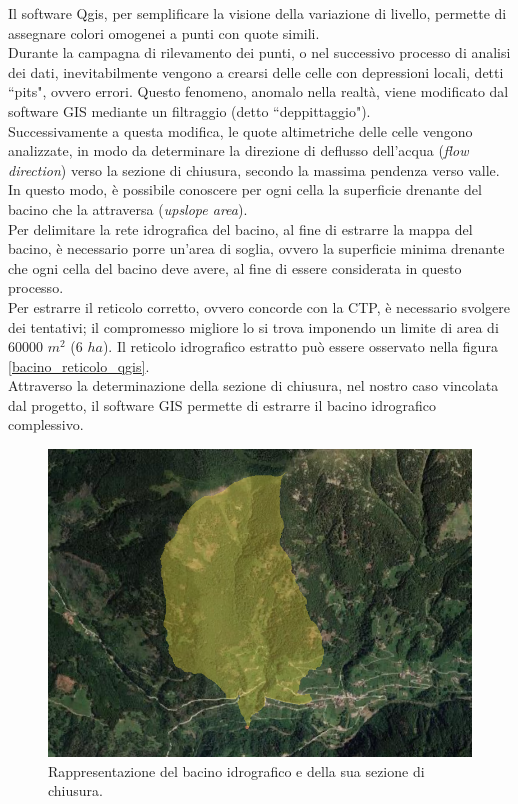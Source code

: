 Il software Qgis, per semplificare la visione della variazione di livello, permette di assegnare colori omogenei a punti con quote simili.\\ 
Durante la campagna di rilevamento dei punti, o nel successivo processo di analisi dei dati, inevitabilmente vengono a crearsi delle celle con depressioni locali, detti ``pits", ovvero errori. Questo fenomeno, anomalo nella realtà, viene modificato dal software GIS mediante un filtraggio (detto ``deppittaggio").\\
Successivamente a questa modifica, le quote altimetriche delle celle vengono analizzate, in modo da determinare la direzione di deflusso dell'acqua (\textit{flow direction}) verso la sezione di chiusura, secondo la massima pendenza verso valle.\\
In questo modo, è possibile conoscere per ogni cella la superficie drenante del bacino che la attraversa (\textit{upslope area}).\\
Per delimitare la rete idrografica del bacino, al fine di estrarre la mappa del bacino, è necessario porre un'area di soglia, ovvero la superficie minima drenante che ogni cella del bacino deve avere, al fine di essere considerata in questo processo.\\
Per estrarre il reticolo corretto, ovvero concorde con la CTP, è necessario svolgere dei tentativi; il compromesso migliore lo si trova imponendo un limite di area di 60000 $m^2$ (6 $ha$). Il reticolo idrografico estratto può essere osservato nella figura \ref{bacino_reticolo_qgis}.\\
Attraverso la determinazione della sezione di chiusura, nel nostro caso vincolata dal progetto, il software GIS permette di estrarre il bacino idrografico complessivo.\\
\begin{figure}[H]\centering
    \includegraphics[scale=.50]{immagini/bacino_qgis.PNG}
    \caption{Rappresentazione del bacino idrografico e della sua sezione di chiusura.}
    \label{bacino_qgis}
\end{figure}
